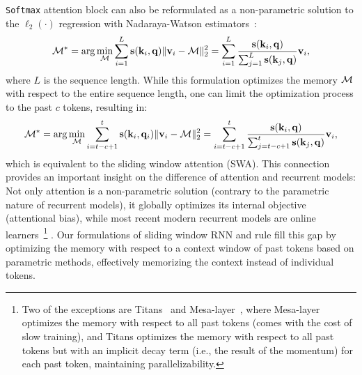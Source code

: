 \texttt{Softmax} attention block can also be reformulated as a non-parametric  solution to the $\ell_2(\cdot)$ regression  with  Nadaraya-Watson estimators~\citep{zhang2022analysis, fan2018local}:
\begin{align}
    \mathcal{M}^* = \arg\min_{\mathcal{M}} \sum_{i = 1}^{L} \mathbf{s}(\mathbf{k}_i, \mathbf{q}) \|\mathbf{v}_i - \mathcal{M} \|^2_2
    = \sum_{i = 1}^{L} \frac{\mathbf{s}(\mathbf{k}_i, \mathbf{q})}{\sum_{j = 1}^{L} \mathbf{s}(\mathbf{k}_j, \mathbf{q})} \mathbf{v}_i,
\end{align}
where $L$ is the sequence length. While this formulation optimizes the memory $\mathcal{M}$ with respect to the entire sequence length, one can limit the optimization process to the past $c$ tokens, resulting in:
\begin{align}
    \mathcal{M}^* = \arg\min_{\mathcal{M}} \sum_{i = t - c + 1}^{t} \mathbf{s}(\mathbf{k}_i, \mathbf{q}_i) \|\mathbf{v}_i - \mathcal{M} \|^2_2  = \sum_{i = t-c + 1}^{t} \frac{\mathbf{s}(\mathbf{k}_i, \mathbf{q})}{\sum_{j = t - c + 1}^{t} \mathbf{s}(\mathbf{k}_j, \mathbf{q})} \mathbf{v}_i, 
\end{align}
which is equivalent to the sliding window attention (SWA). This connection provides an important insight on the difference of attention and recurrent models: Not only attention is a non-parametric solution (contrary to the parametric nature of recurrent models), it globally optimizes its internal objective (attentional bias), while most recent modern recurrent models are online learners~\citep{sun2024learning, yang2024gated, behrouz2025Miras, peng2025rwkv7}\footnote{Two of the exceptions are Titans~\citep{behrouz2024titans} and Mesa-layer~\citep{von2023uncovering}, where Mesa-layer optimizes the memory with respect to all past tokens (comes with the cost of slow training), and Titans optimizes the memory with respect to all past tokens but with an implicit decay term (i.e., the result of the momentum) for each past token, maintaining parallelizability.}
. Our formulations of sliding window RNN and \learningrule{} rule fill this gap by optimizing the memory with respect to a context window of past tokens based on parametric methods, effectively memorizing the context instead of individual tokens.


